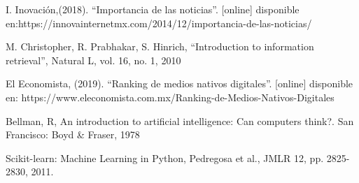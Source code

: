 

\begin{thebibliography}{99}

 I. Inovación,(2018). ``Importancia de las noticias''. [online] disponible en:https://innovainternetmx.com/2014/12/importancia-de-las-noticias/


 M. Christopher, R. Prabhakar, S. Hinrich, ``Introduction to information retrieval'', Natural L, vol. 16, no. 1, 2010

 El Economista, (2019). ``Ranking de medios nativos digitales''. [online] disponible en: https://www.eleconomista.com.mx/Ranking-de-Medios-Nativos-Digitales

 Bellman, R, An introduction to artificial intelligence: Can computers think?. San Francisco: Boyd \& Fraser, 1978

 Scikit-learn: Machine Learning in Python, Pedregosa et al., JMLR 12, pp. 2825-2830, 2011.



\end{thebibliography}

